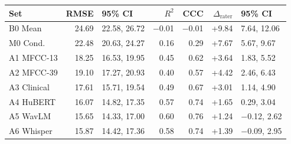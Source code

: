 \footnotesize
\setlength{\tabcolsep}{2pt}
\begin{tabular}{@{}lrlrrrl@{}}
\toprule
Set & RMSE & 95\% CI & $R^2$ & CCC & $\Delta_{\mathrm{rater}}$ & 95\% CI \\
\midrule
B0 Mean & 24.69 & 22.58, 26.72 & $-$0.01 & $-$0.01 & +9.84 & 7.64, 12.06 \\
M0 Cond. & 22.48 & 20.63, 24.27 & 0.16 & 0.29 & +7.67 & 5.67, 9.67 \\
A1 MFCC-13 & 18.25 & 16.53, 19.95 & 0.45 & 0.62 & +3.64 & 1.83, 5.52 \\
A2 MFCC-39 & 19.10 & 17.27, 20.93 & 0.40 & 0.57 & +4.42 & 2.46, 6.43 \\
A3 Clinical & 17.61 & 15.71, 19.54 & 0.49 & 0.67 & +3.01 & 1.14, 4.90 \\
A4 HuBERT & 16.07 & 14.82, 17.35 & 0.57 & 0.74 & +1.65 & 0.29, 3.04 \\
A5 WavLM & 15.65 & 14.33, 17.00 & 0.60 & 0.76 & +1.24 & $-$0.12, 2.62 \\
A6 Whisper & 15.87 & 14.42, 17.36 & 0.58 & 0.74 & +1.39 & $-$0.09, 2.95 \\
\bottomrule
\end{tabular}
